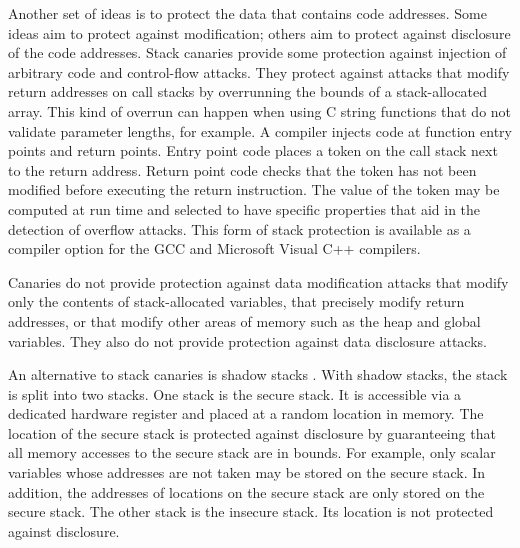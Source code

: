 Another set of ideas is to protect the data that contains 
code addresses.  Some ideas aim to protect against modification;
others aim to protect against disclosure of the code addresses.
Stack canaries \cite{Cowan1998, Dang2015, Petsios2015} provide 
some protection against injection of 
arbitrary code and control-flow attacks.
They protect against attacks that modify return addresses
on call stacks by overrunning the bounds of a stack-allocated array.  
This kind of overrun can happen when using C string functions that do
not validate parameter lengths, for example.   A
compiler injects code at function entry points and return
points. Entry point code places a token on the call stack
next to the return address.  Return point code checks that
the token has not been modified before executing the return
instruction.  The value of the token may be computed at run time
and selected to have specific properties that aid in the detection
of overflow attacks.  This form of stack protection is available as a
compiler option for the GCC and Microsoft Visual C++ compilers.

Canaries do not provide protection against data modification attacks
that modify only the contents of stack-allocated variables, that
precisely modify return addresses, or that modify other areas 
of memory such as the heap and global variables. They also do not
provide protection against data disclosure attacks. 

An alternative to stack canaries is shadow stacks \cite{Abadi2005, 
Baratloo2000, Bhatkar2005, Chiueh2001, Corliss2005, Erlingsson2006,
Frantzen2001, Kuznetsov2014}.
With shadow stacks,
the stack is split into two stacks.  One stack is the secure stack. It
is accessible via a dedicated hardware register and placed at a random
location in memory.   The location of the secure stack is protected
against disclosure by guaranteeing that all memory accesses
to the secure stack are in bounds.  For example, only scalar variables whose
addresses are not taken may be stored on the secure stack. In addition, 
the addresses of locations on the secure stack are only stored on the secure
stack.   The other stack is the insecure stack.  Its location is not
protected against disclosure.


